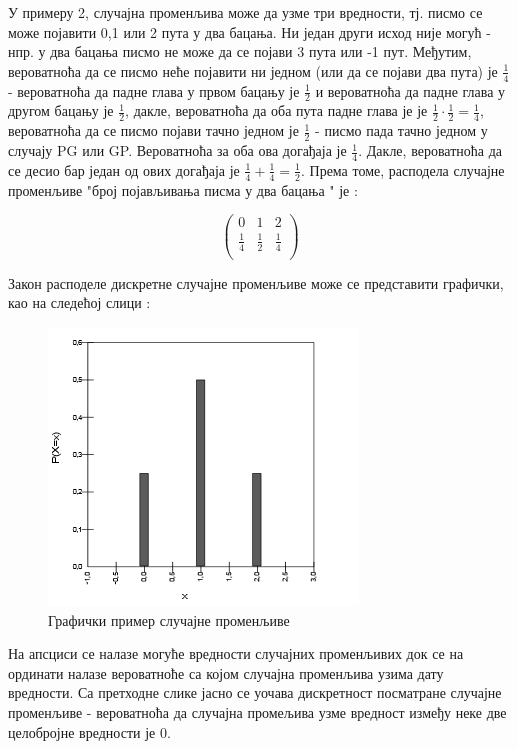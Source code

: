 У примеру 2, случајна променљива може да узме три вредности, тј. писмо се може појавити 0,1 или 2 пута у два бацања. Ни један други исход није могућ - нпр. у два бацања писмо не може да се појави 3 пута или -1 пут. Међутим, вероватноћа да се писмо неће појавити ни једном (или да се појави два пута) је $\frac{1}{4}$ - вероватноћа да падне глава у првом бацању је $\frac{1}{2}$ и вероватноћа да падне глава у другом бацању је   $\frac{1}{2}$, дакле, вероватноћа да оба пута падне глава је је  $\frac{1}{2} \cdot \frac{1}{2} = \frac{1}{4}$, вероватноћа да се писмо појави тачно једном је $\frac{1}{2}$ - писмо пада тачно једном у случају PG или GP. Вероватноћа за оба ова догађаја је $\frac{1}{4}$. Дакле, вероватноћа да се десио бар један од ових догађаја је  $\frac{1}{4} + \frac{1}{4} = \frac{1}{2}$. Према томе, расподела случајне променљиве "број појављивања писма у два бацања " је :


$$ 
\left(
\begin{array}{ccc}
0 & 1 & 2 \\
\frac{1}{4} & \frac{1}{2} & \frac{1}{4} \\
\end{array}
\right)
$$

Закон расподеле дискретне случајне променљиве може се представити графички, као на следећој слици :

\begin{figure}[H]
    \centering
   \includegraphics[scale=0.8]{./Slike/slika13.png} 
	\caption{Графички пример случајне променљиве}
	\label{fig:slika13}
\end{figure}

На апсциси се налазе могуће вредности случајних променљивих док се на ординати налазе вероватноће са којом случајна променљива узима дату вредности. Са претходне слике јасно се уочава дискретност посматране случајне променљиве - вероватноћа да случајна промељива узме вредност између неке две целобројне вредности је 0. 
\\
\\

